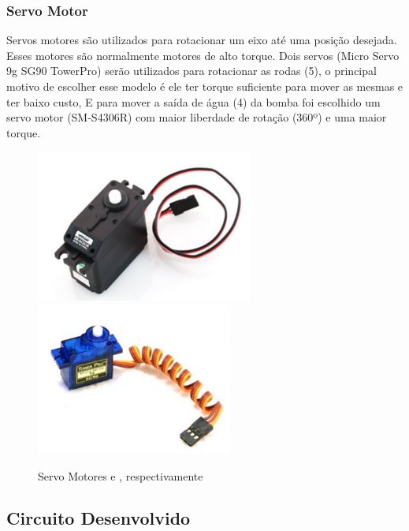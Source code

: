 \subsubsection{Servo Motor}
Servos motores são utilizados para rotacionar um eixo até uma posição desejada. Esses motores são normalmente motores de alto torque. Dois servos (Micro Servo 9g SG90 TowerPro) serão utilizados para rotacionar as rodas (5), o principal motivo de escolher esse modelo é ele ter torque suficiente para mover as mesmas e ter baixo custo, E para mover a saída de água (4) da bomba foi escolhido um servo motor (SM-S4306R) com maior liberdade de rotação (360º) e uma maior torque.
\begin{figure}[h]
  \centering
	\includegraphics[height=5cm]{figures/servant-motor.png}
	\quad
	\includegraphics[height=5cm]{figures/micro-motor.png}
  \caption{Servo Motores \cite{flipflop2013} e \cite{flipflop2016}, respectivamente}
\end{figure}
\FloatBarrier

\subsection{Circuito Desenvolvido}
